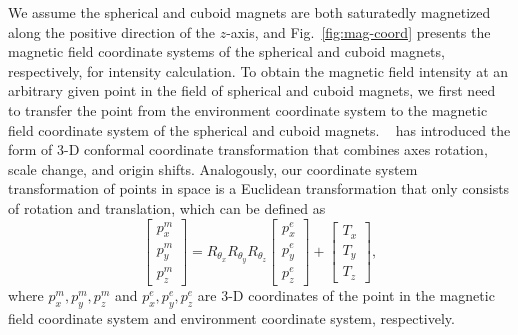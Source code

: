 \documentclass[journal]{IEEEtran}
\begin{document}
We assume the spherical and cuboid magnets are both saturatedly magnetized along the positive direction of the $z$-axis, and Fig.~\ref{fig:mag-coord} presents the magnetic field coordinate systems of the spherical and cuboid magnets, respectively, for intensity calculation.
To obtain the magnetic field intensity at an arbitrary given point in the field of spherical and cuboid magnets, we first need to transfer the point from the environment coordinate system to the magnetic field coordinate system of the spherical and cuboid magnets.
~\citet{deakin19983} has introduced the form of 3-D conformal coordinate transformation that combines axes rotation, scale change, and origin shifts. 
Analogously, our coordinate system transformation of points in space is a Euclidean transformation that only consists of rotation and translation, which can be defined as
\begin{equation}
    \begin{bmatrix}
        p^{m}_{x} \\ p^{m}_{y} \\ p^{m}_{z}
    \end{bmatrix}
    = R_{\theta_x} R_{\theta_y} R_{\theta_z} 
    \begin{bmatrix}
        p^{e}_{x} \\ p^{e}_{y} \\ p^{e}_{z}
    \end{bmatrix} + 
    \begin{bmatrix}
        T_{x} \\ T_{y} \\ T_{z}
    \end{bmatrix},
\label{pos-trans}
\end{equation}
where $p^{m}_{x}, p^{m}_{y}, p^{m}_{z}$ and $p^{e}_{x}, p^{e}_{y}, p^{e}_{z}$ are 3-D coordinates of the point in the magnetic field coordinate system and environment coordinate system, respectively. 
\end{document}
